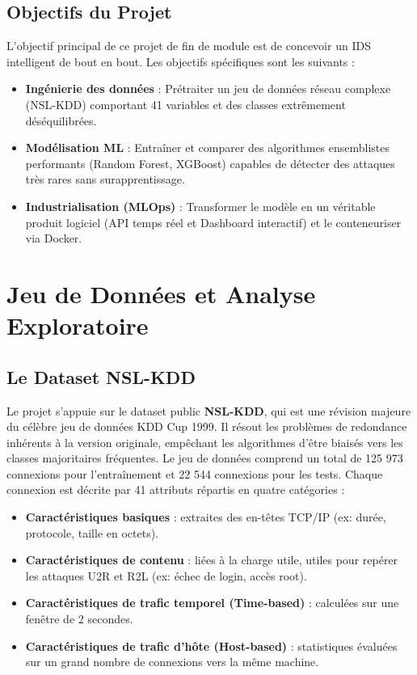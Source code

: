 \documentclass[12pt,a4paper]{report}
\begin{document}
\section{Objectifs du Projet}
L'objectif principal de ce projet de fin de module est de concevoir un IDS intelligent de bout en bout. Les objectifs spécifiques sont les suivants :
\begin{itemize}
    \item \textbf{Ingénierie des données} : Prétraiter un jeu de données réseau complexe (NSL-KDD) comportant 41 variables et des classes extrêmement déséquilibrées.
    \item \textbf{Modélisation ML} : Entraîner et comparer des algorithmes ensemblistes performants (Random Forest, XGBoost) capables de détecter des attaques très rares sans surapprentissage.
    \item \textbf{Industrialisation (MLOps)} : Transformer le modèle en un véritable produit logiciel (API temps réel et Dashboard interactif) et le conteneuriser via Docker.
\end{itemize}

\chapter{Jeu de Données et Analyse Exploratoire}

\section{Le Dataset NSL-KDD}
Le projet s'appuie sur le dataset public \textbf{NSL-KDD}, qui est une révision majeure du célèbre jeu de données KDD Cup 1999. Il résout les problèmes de redondance inhérents à la version originale, empêchant les algorithmes d'être biaisés vers les classes majoritaires fréquentes.
Le jeu de données comprend un total de 125 973 connexions pour l'entraînement et 22 544 connexions pour les tests. Chaque connexion est décrite par 41 attributs répartis en quatre catégories :
\begin{itemize}
    \item \textbf{Caractéristiques basiques} : extraites des en-têtes TCP/IP (ex: durée, protocole, taille en octets).
    \item \textbf{Caractéristiques de contenu} : liées à la charge utile, utiles pour repérer les attaques U2R et R2L (ex: échec de login, accès root).
    \item \textbf{Caractéristiques de trafic temporel (Time-based)} : calculées sur une fenêtre de 2 secondes.
    \item \textbf{Caractéristiques de trafic d'hôte (Host-based)} : statistiques évaluées sur un grand nombre de connexions vers la même machine.
\end{itemize}
\end{document}
